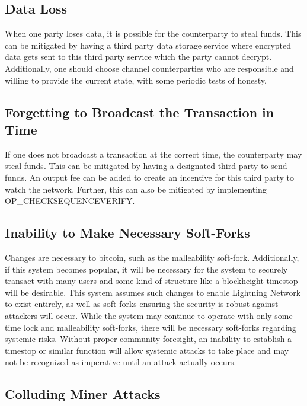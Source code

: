 \documentclass[letterpaper,11pt]{article}
\begin{document}
\subsection{Data Loss}

When one party loses data, it is possible for the counterparty to steal funds.
This can be mitigated by having a third party data storage service where
encrypted data gets sent to this third party service which the party cannot
decrypt. Additionally, one should choose channel counterparties who are
responsible and willing to provide the current state, with some periodic tests
of honesty.

\subsection{Forgetting to Broadcast the Transaction in Time}

If one does not broadcast a transaction at the correct time, the counterparty
may steal funds. This can be mitigated by having a designated third party to send
funds. An output fee can be added to create an incentive for this third party to
watch the network. Further, this can also be mitigated by implementing
OP\_CHECKSEQUENCEVERIFY.

\subsection{Inability to Make Necessary Soft-Forks}

Changes are necessary to bitcoin, such as the malleability soft-fork.
Additionally, if this system becomes popular, it will be necessary for the
system to securely transact with many users and some kind of structure like a
blockheight timestop will be desirable. This system assumes such changes to
enable Lightning Network to exist entirely, as well as soft-forks ensuring the
security is robust against attackers will occur. While the system may continue
to operate with only some time lock and malleability soft-forks, there will be
necessary soft-forks regarding systemic risks. Without proper community
foresight, an inability to establish a timestop or similar function will allow
systemic attacks to take place and may not be recognized as imperative until an
attack actually occurs.

\subsection{Colluding Miner Attacks}
\end{document}
